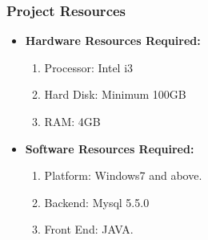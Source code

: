 \subsubsection{Project Resources}
         \begin{itemize}
	\item \textbf{Hardware Resources Required:}
	
	\begin{enumerate}
		\item Processor: Intel i3
		\item Hard Disk: Minimum 100GB
		\item RAM: 4GB
	\end{enumerate}
\end{itemize}

\begin{itemize}
	\item \textbf{Software Resources Required:}
	
	\begin{enumerate}
		\item Platform: Windows7 and above.
		\item Backend: Mysql 5.5.0
		\item Front End: JAVA.
	\end{enumerate}
\end{itemize} 


